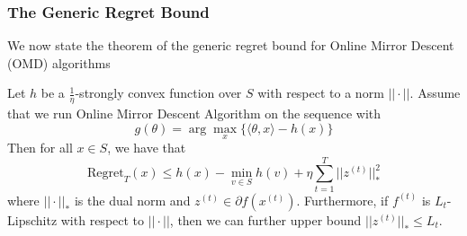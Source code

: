 \subsubsection{The Generic Regret Bound}
We now state the theorem of the generic regret bound for Online Mirror Descent (OMD) algorithms
\begin{theorem}\label{thm:generic_OMD_regret_bound}
    Let $h$ be a $\frac{1}{\eta}$-strongly convex function over $S$ with respect to a norm $||\cdot||$. Assume that we run Online Mirror Descent Algorithm on the sequence with \begin{equation}\label{eqn:g_argmax}
        g(\theta) = \arg\max_x \{\langle \theta, x \rangle - h(x)\}
    \end{equation}
    Then for all $x \in S$, we have that \begin{equation}
        \text{Regret}_T(x)\leq h(x) - \min_{v \in S} h(v) + \eta \sum_{t=1}^T ||z^{(t)}||_*^2
    \end{equation} where $||\cdot||_*$ is the dual norm and $z^{(t)} \in \partial f(x^{(t)})$. Furthermore, if $f^{(t)}$ is $L_t$-Lipschitz with respect to $||\cdot||$, then we can further upper bound $||z^{(t)}||_* \leq L_t$.
\end{theorem}
